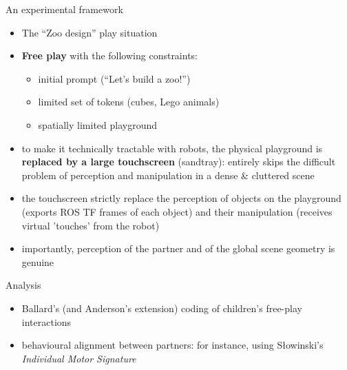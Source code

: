 \documentclass[compress]{beamer}
\begin{document}

\begin{frame}{An experimental framework}

    \begin{itemize}
        \item The ``Zoo design'' play situation
        \item {\bf Free play} with the following constraints:
            \begin{itemize}
                \item initial prompt (``Let's build a zoo!'')
                \item limited set of tokens (cubes, Lego animals)
                \item spatially limited playground
            \end{itemize}
        \item<2-> to make it technically tractable with robots, the physical
            playground is {\bf replaced by a large touchscreen} (sandtray): entirely
            skips the difficult problem of perception and manipulation in a
            dense \& cluttered scene
        \item<2-> the touchscreen strictly
            replace the perception of objects on the playground (exports
            ROS TF frames of each object) and their manipulation (receives
            virtual 'touches' from the robot)
        \item<2-> importantly, perception of the partner and of the global scene
            geometry is genuine
    \end{itemize}
\end{frame}



\begin{frame}{Analysis}

    \begin{itemize}
        \item Ballard's (and Anderson's extension) coding of children's free-play interactions
        \item behavioural alignment between partners: for instance, using
            Słowinski's \emph{Individual Motor Signature}
    \end{itemize}
\end{frame}
\end{document}
